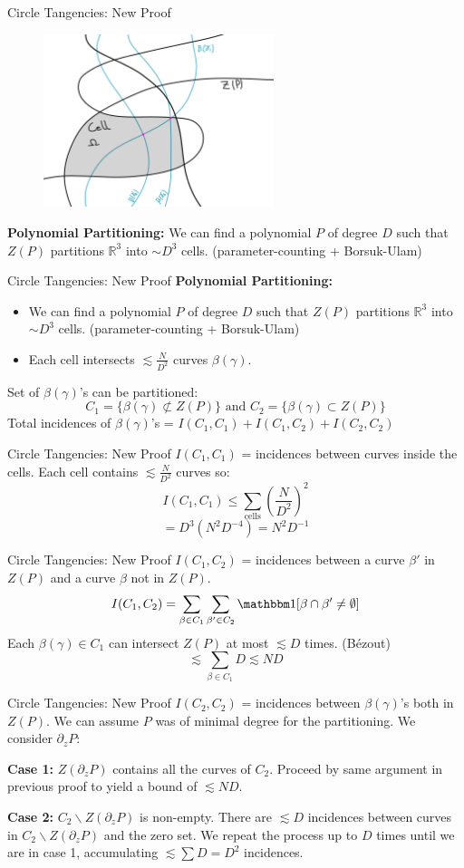 \documentclass{beamer}
\newcommand{\OO}{\mathbbm 1}
\newcommand{\RR}{\mathbb R}
\newcommand{\nfr}[1]{\begin{frame} #1
\end{frame}}
\begin{document}
\nfr{{Circle Tangencies: New Proof }
\begin{figure}[h]
    \centering
    \includegraphics[width=0.6\textwidth]{images/new_proof_c.png}
\end{figure}
\textbf{Polynomial Partitioning:} We can find a polynomial $P$ of degree $D$ such that $Z(P)$ partitions $\RR^3$ into $\sim D^3$ cells. (parameter-counting + Borsuk-Ulam)
}

\nfr{{Circle Tangencies: New Proof }
\textbf{Polynomial Partitioning:} 
\begin{itemize}
    \item We can find a polynomial $P$ of degree $D$ such that $Z(P)$ partitions $\RR^3$ into $\sim D^3$ cells. (parameter-counting + Borsuk-Ulam)
    \item Each cell intersects $\lesssim \frac{N}{D^2}$ curves $\beta(\gamma)$.
\end{itemize}
Set of $\beta(\gamma)$'s can be partitioned:
\[
   C_1 = \{\beta(\gamma) \not \subset Z(P) \} \text{ and } C_2 = \{\beta(\gamma) \subset Z(P) \} 
\]
Total incidences of $\beta(\gamma)$'s = $I(C_1,C_1) +I(C_1,C_2) + I(C_2,C_2)$  
}
\nfr{{Circle Tangencies: New Proof }
$I(C_1,C_1)$ = incidences between curves inside the cells. Each cell contains $\lesssim \frac{N}{D^2}$ curves so:
\[
  I(C_1,C_1) \leq \sum_{\text{cells}} \left(\frac{N}{D^2} \right)^2 
\]
\[
 = D^3 (N^2 D^{-4}) = N^2D^{-1}
\]
}

\nfr{{Circle Tangencies: New Proof }
$I(C_1,C_2)$ = incidences between a curve $\beta'$ in $Z(P)$ and a curve $\beta$ not in $Z(P)$.
\[
    I(C_1,C_2) = \sum_{\beta \in C_1} \sum_{\beta' \in C_2} \OO[\beta \cap \beta' \neq \emptyset]
\]
Each $\beta(\gamma) \in C_1$ can intersect $Z(P)$ at most $\lesssim D$ times. (Bézout)
\[
\lesssim  \sum_{\beta \in C_1} D \lesssim ND
\]
}

\nfr{{Circle Tangencies: New Proof }
$I(C_2,C_2)$ = incidences between $\beta(\gamma)$'s both in $Z(P)$. 
We can assume $P$ was of minimal degree for the partitioning.
We consider $\partial_z P$:

\textbf{Case 1:} $Z(\partial_z P)$ contains all the curves of $C_2$. Proceed by same argument in previous proof to yield a bound of $\lesssim ND$.

\pause
\textbf{Case 2:} $C_2 \backslash Z(\partial_z P)$ is non-empty. There are $\lesssim D$ incidences between curves in $C_2 \backslash Z(\partial_z P)$ and the zero set. 
We repeat the process up to $D$ times until we are in case 1, accumulating $ \lesssim \sum D = D^2$ incidences.
}
\end{document}
